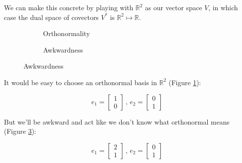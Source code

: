 We can make this concrete by playing with $\mathbb{R}^2$ as our vector space $V$, in which case the dual space of covectors $V^*$ is $\mathbb{R}^2 \mapsto \mathbb{R}$.

\begin{figure}[h]
    \caption{Basis vectors in $\mathbb{R}^2$}
    \begin{subfigure}{0.5\textwidth}
        \centering
        \caption{Orthonormality} \label{fig:vectors-orthonormality}
    \end{subfigure}
    \begin{subfigure}{0.5\textwidth}
        \centering
        \caption{Awkwardness} \label{fig:vectors-awkwardness}
    \end{subfigure}
\end{figure}

It would be easy to choose an orthonormal basis in $\mathbb{R}^2$ (Figure \ref{fig:vectors-orthonormality}):

$$
e_1 = \begin{bmatrix}1 \\ 0\end{bmatrix}\,,\,
e_2 = \begin{bmatrix}0 \\ 1\end{bmatrix}
$$

But we'll be awkward and act like we don't know what orthonormal means (Figure \ref{fig:vectors-awkwardness}):

$$
e_1 = \begin{bmatrix}2 \\ 1\end{bmatrix}\,,\,
e_2 = \begin{bmatrix}0 \\ 1\end{bmatrix}
$$

